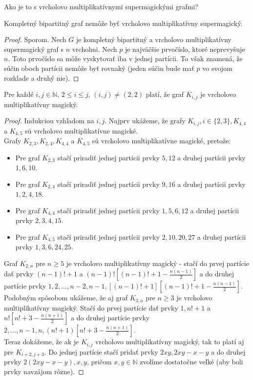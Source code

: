 Ako je to s vrcholovo multiplikatívnymi supermagickými grafmi?

\begin{theorem} Kompletný bipartitný graf nemôže byť vrcholovo multiplikatívny supermagický.
\end{theorem}

\begin{proof} Sporom. Nech $G$ je kompletný bipartitný a vrcholovo multiplikatívny supermagický graf s $n$ vrcholmi. Nech $p$ je najväčšie prvočíslo, ktoré neprevyšuje $n$. Toto prvočíslo sa môže vyskytovať iba v jednej partícii. To však znamená, že súčin oboch partícii nemôže byť rovnaký (jeden súčin bude mať $p$ vo svojom rozklade a druhý nie).
\end{proof}

\begin{theorem}
\label{vmmgkij}
Pre každé $i,j \in \mathbb{N}$, $2 \leq i \leq j$, $(i, j) \neq (2, 2)$ platí, že graf $K_{i,j}$ je vrcholovo multiplikatívny magický.
\end{theorem}

\begin{proof} Indukciou vzhľadom na $i,j$. Najprv ukážeme, že grafy $K_{i,j}, i \in \{2,3\}, K_{4,4}$ a $K_{4,5}$ sú vrcholovo multiplikatívne magické. \\

Grafy $K_{2,3}, K_{2,4}, K_{4,4}$ a $K_{4,5}$ sú vrcholovo multiplikatívne magické, pretože:
\begin{itemize}
\item Pre graf $K_{2,3}$ stačí priradiť jednej partícii prvky $5, 12$ a druhej partícii prvky $1, 6, 10$.
\item Pre graf $K_{2,4}$ stačí priradiť jednej partícii prvky $9, 16$ a druhej partícii prvky $1, 2, 4, 18$.
\item Pre graf $K_{4,4}$ stačí priradiť jednej partícii prvky $1, 5, 6, 12$ a druhej partícii prvky $2, 3, 4, 15$.
\item Pre graf $K_{4,5}$ stačí priradiť jednej partícii prvky $2, 10, 20, 27$ a druhej partícii prvky $1, 3, 6, 24, 25$.
\end{itemize}

Graf $K_{2,n}$ pre $n \geq 5$ je vrcholovo multiplikatívny magický - stačí do prvej partície dať prvky $(n-1)! + 1$ a $(n-1)! [(n-1)! + 1 - \frac{n(n-1)}{2}]$ a do druhej partície prvky $1, 2, \dots , n-2, n-1, [(n-1)! + 1] [(n-1)! + 1 - \frac{n(n-1)}{2}]$. \\

Podobným spôsobom ukážeme, že aj graf $K_{3,n}$ pre $n \geq 3$ je vrcholovo multiplikatívny magický. Stačí do prvej partície dať prvky $1, n! + 1$ a $n! [n! + 3 - \frac{n(n+1)}{2}]$ a do druhej partície prvky $2, \dots , n-1, n, (n! + 1) [n! + 3 - \frac{n(n+1)}{2}]$. \\

Teraz dokážeme, že ak je $K_{i,j}$ vrcholovo multiplikatívny magický, tak to platí aj pre $K_{i+2,j+3}$. Do jednej partície stačí pridať prvky $2xy, 2xy - x - y$ a do druhej prvky $2(2xy - x - y), x, y$, pričom $x,y \in \mathbb{N}$ zvolíme dostatočne veľké (aby boli prvky navzájom rôzne).
\end{proof}



